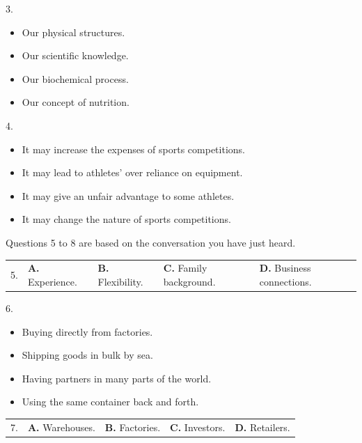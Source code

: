 \documentclass[UTF8,11pt]{ctexart}
\begin{document}
3.


\begin{itemize}[leftmargin=2em,itemsep=.2em,topsep=.4em]\item[A.] Our physical structures.
\item[B.] Our scientific knowledge.
\item[C.] Our biochemical process.
\item[D.] Our concept of nutrition.
\end{itemize}

4.


\begin{itemize}[leftmargin=2em,itemsep=.2em,topsep=.4em]\item[A.] It may increase the expenses of sports competitions.
\item[B.] It may lead to athletes’ over reliance on equipment.
\item[C.] It may give an unfair advantage to some athletes.
\item[D.] It may change the nature of sports competitions.
\end{itemize}

Questions 5 to 8 are based on the conversation you have just heard.


\noindent\begin{tabularx}{\linewidth}{@{}lXXXX@{}}5. & \textbf{A.} Experience. & \textbf{B.} Flexibility. & \textbf{C.} Family background. & \textbf{D.} Business connections.\\\end{tabularx}\par

6.


\begin{itemize}[leftmargin=2em,itemsep=.2em,topsep=.4em]\item[A.] Buying directly from factories.
\item[B.] Shipping goods in bulk by sea.
\item[C.] Having partners in many parts of the world.
\item[D.] Using the same container back and forth.
\end{itemize}

\noindent\begin{tabularx}{\linewidth}{@{}lXXXX@{}}7. & \textbf{A.} Warehouses. & \textbf{B.} Factories. & \textbf{C.} Investors. & \textbf{D.} Retailers.\\\end{tabularx}\par
\end{document}

